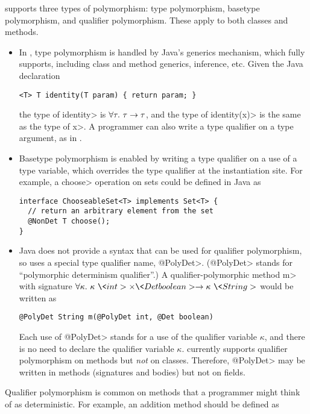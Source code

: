 \OurTypeSystem supports three types of polymorphism:  type
polymorphism, basetype polymorphism, and qualifier polymorphism.
These apply to both classes and methods.

\begin{itemize}
\item
In \theDeterminismCheckerImplementation,
type polymorphism is handled by Java's generics mechanism, which
\theDeterminismChecker fully supports, including class and method generics,
inference, etc.
Given the Java declaration
\begin{Verbatim}
<T> T identity(T param) { return param; }
\end{Verbatim}
the type of \<identity> is $\forall \tau . \  \tau \rightarrow \tau$, and
the type of \<identity(x)> is the same as the type of
\<x>.  A programmer can also write a type qualifier on a type argument,
as in .
\item
Basetype polymorphism is enabled by writing a type qualifier on a use of a
type variable, which overrides the type qualifier at the instantiation
site.
For example, a \<choose> operation on sets could be defined in Java as
\begin{Verbatim}
interface ChooseableSet<T> implements Set<T> {
  // return an arbitrary element from the set
  @NonDet T choose();
}
\end{Verbatim}
\item
Java does not provide a syntax that can be used for qualifier polymorphism,
so \theDeterminismChecker uses a special type qualifier name, \<@PolyDet>.  (\<@PolyDet> stands
for ``polymorphic determinism qualifier''.)
A qualifier-polymorphic method \<m> with signature
$\forallt{\kappa} \kappa\ \<int> \times \<Det boolean>
\rightarrow \kappa\ \<String>$ would be written as
\begin{Verbatim}
@PolyDet String m(@PolyDet int, @Det boolean)
\end{Verbatim}
Each use of \<@PolyDet> stands for a use of the qualifier variable
$\kappa$, and there is no need to declare the qualifier variable $\kappa$.
\TheDeterminismChecker currently supports
qualifier
polymorphism on methods but \emph{not} on classes.
Therefore, \<@PolyDet> may be written in methods (signatures and bodies)
but not on fields.
\end{itemize}

Qualifier  polymorphism is common on methods that a programmer might think
of as deterministic.  For example, an addition method should be defined as

